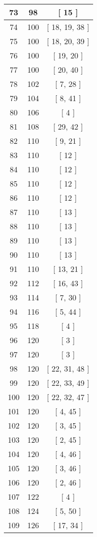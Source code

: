 \begin{center}
\begin{longtable}[H]{|| c c c ||}
\hline
73 & 98 & [ 15 ] \\ 
\hline
74 & 100 & [ 18, 19, 38 ] \\ 
\hline
75 & 100 & [ 18, 20, 39 ] \\ 
\hline
76 & 100 & [ 19, 20 ] \\ 
\hline
77 & 100 & [ 20, 40 ] \\ 
\hline
78 & 102 & [ 7, 28 ] \\ 
\hline
79 & 104 & [ 8, 41 ] \\ 
\hline
80 & 106 & [ 4 ] \\ 
\hline
81 & 108 & [ 29, 42 ] \\ 
\hline
82 & 110 & [ 9, 21 ] \\ 
\hline
83 & 110 & [ 12 ] \\ 
\hline
84 & 110 & [ 12 ] \\ 
\hline
85 & 110 & [ 12 ] \\ 
\hline
86 & 110 & [ 12 ] \\ 
\hline
87 & 110 & [ 13 ] \\ 
\hline
88 & 110 & [ 13 ] \\ 
\hline
89 & 110 & [ 13 ] \\ 
\hline
90 & 110 & [ 13 ] \\ 
\hline
91 & 110 & [ 13, 21 ] \\ 
\hline
92 & 112 & [ 16, 43 ] \\ 
\hline
93 & 114 & [ 7, 30 ] \\ 
\hline
94 & 116 & [ 5, 44 ] \\ 
\hline
95 & 118 & [ 4 ] \\ 
\hline
96 & 120 & [ 3 ] \\ 
\hline
97 & 120 & [ 3 ] \\ 
\hline
98 & 120 & [ 22, 31, 48 ] \\ 
\hline
99 & 120 & [ 22, 33, 49 ] \\ 
\hline
100 & 120 & [ 22, 32, 47 ] \\ 
\hline
101 & 120 & [ 4, 45 ] \\ 
\hline
102 & 120 & [ 3, 45 ] \\ 
\hline
103 & 120 & [ 2, 45 ] \\ 
\hline
104 & 120 & [ 4, 46 ] \\ 
\hline
105 & 120 & [ 3, 46 ] \\ 
\hline
106 & 120 & [ 2, 46 ] \\ 
\hline
107 & 122 & [ 4 ] \\ 
\hline
108 & 124 & [ 5, 50 ] \\ 
\hline
109 & 126 & [ 17, 34 ] \\ 

\end{longtable}
\end{center}
